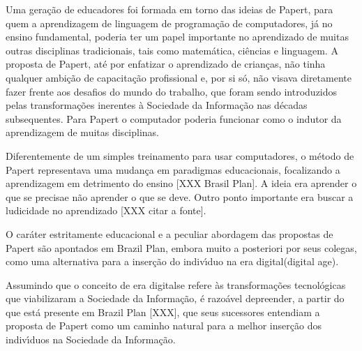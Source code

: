 \documentclass[
12pt,		%
openright,	%
twoside,  %
a4paper,			%
chapter=TITLE,		%
english,			%
french,				%
spanish,			%
brazil				%
]{USPSC-classe/USPSC}
\begin{document}
Uma gera\c{c}\~ao de educadores foi formada em torno das ideias de Papert, para quem a aprendizagem de linguagem de programa\c{c}\~ao de computadores, j\'a no ensino fundamental, poderia ter um papel importante no aprendizado de muitas outras disciplinas tradicionais, tais como matem\'atica, ci\^encias e linguagem. A proposta de Papert, at\'e por enfatizar o aprendizado de crian\c{c}as, n\~ao tinha qualquer ambi\c{c}\~ao de capacita\c{c}\~ao profissional e, por si s\'o, n\~ao visava diretamente fazer frente aos desafios do \textquotedbl mundo do trabalho\textquotedbl , que foram sendo introduzidos pelas transforma\c{c}\~oes inerentes \`a Sociedade da Informa\c{c}\~ao nas d\'ecadas subsequentes. Para Papert o computador poderia funcionar como o indutor da aprendizagem de muitas disciplinas.














Diferentemente de um simples treinamento para usar computadores, o m\'etodo de Papert representava uma mudan\c{c}a em paradigmas educacionais, focalizando a aprendizagem em detrimento do ensino [XXX Brasil Plan]. A ideia era \textquotedbl aprender o que se precisa\textquotedbl  e n\~ao \textquotedbl aprender o que se deve. Outro ponto importante era buscar a ludicidade no aprendizado [XXX citar a fonte].














O car\'ater estritamente educacional e a peculiar abordagem das propostas de Papert s\~ao apontados em \textquotedbl Brazil Plan\textquotedbl  [XXX], embora muito a posteriori por seus colegas, como uma alternativa para a inser\c{c}\~ao do indiv\'{\i}duo na \textquotedbl era digital\textquotedbl  (digital age).














Assumindo que o conceito de \textquotedbl era digital\textquotedbl  se refere \`as transforma\c{c}\~oes tecnol\'ogicas que viabilizaram a  \textquotedbl Sociedade da Informa\c{c}\~ao\textquotedbl ,  \'e razo\'avel depreender, a partir do que est\'a presente em Brazil Plan [XXX], que seus sucessores entendiam a proposta de Papert como um caminho natural para a melhor inser\c{c}\~ao dos indiv\'{\i}duos na Sociedade da Informa\c{c}\~ao.
\end{document}
